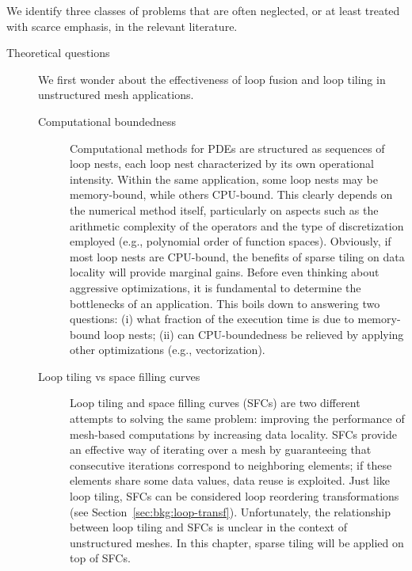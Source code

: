 We identify three classes of problems that are often neglected, or at least treated with scarce emphasis, in the relevant literature. 

\begin{description}
\item[Theoretical questions] We first wonder about the effectiveness of loop fusion and loop tiling in unstructured mesh applications.

\begin{description}
\item[Computational boundedness] Computational methods for PDEs are structured as sequences of loop nests, each loop nest characterized by its own operational intensity. Within the same application, some loop nests may be memory-bound, while others CPU-bound. This clearly depends on the numerical method itself, particularly on aspects such as the arithmetic complexity of the operators and the type of discretization employed (e.g., polynomial order of function spaces). Obviously, if most loop nests are CPU-bound, the benefits of sparse tiling on data locality will provide marginal gains. Before even thinking about aggressive optimizations, it is fundamental to determine the bottlenecks of an application. This boils down to answering two questions: (i) what fraction of the execution time is due to memory-bound loop nests; (ii) can CPU-boundedness be relieved by applying other optimizations (e.g., vectorization).
\item[Loop tiling vs space filling curves] Loop tiling and space filling curves (SFCs) are two different attempts to solving the same problem: improving the performance of mesh-based computations by increasing data locality. SFCs provide an effective way of iterating over a mesh by guaranteeing that consecutive iterations correspond to neighboring elements; if these elements share some data values, data reuse is exploited. Just like loop tiling, SFCs can be considered loop reordering transformations (see Section~\ref{sec:bkg:loop-transf}). Unfortunately, the relationship between loop tiling and SFCs is unclear in the context of unstructured meshes. In this chapter, sparse tiling will be applied on top of SFCs.
\end{description}


\end{description}
